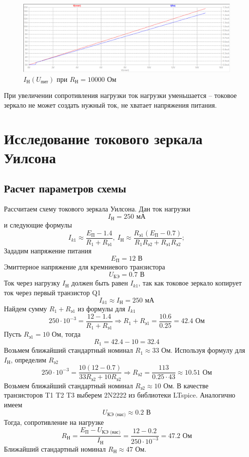 \documentclass[a4paper, 12pt]{article}
\begin{document}
    \begin{figure}[H]
        \centering
        \includegraphics[scale=0.46]{1task_Iн(Vпит)_Rн10000.png}
        \captionsetup{skip=0pt}
        \caption{$I_\text{Н}\left( U_\text{пит} \right)$ при $R_\text{Н}=10000$ Ом}
        \label{fig:1task_InVlR10000}
    \end{figure}
    \noindent При увеличении сопротивления нагрузки ток нагрузки уменьшается -- токовое зеркало не может создать нужный ток,
    не хватает напряжения питания.


    \section{Исследование токового зеркала Уилсона}
    \subsection{Расчет параметров схемы}
    Рассчитаем схему токового зеркала Уилсона. Дан ток нагрузки
    $$
    I_\text{Н}=250\text{ мА}
    $$
    и следующие формулы
    $$
    I_{k1}\approx\dfrac{E_\text{П}-1.4}{R_1+R_\text{э1}},\ I_\text{Н}\approx\dfrac{R_\text{э1}\left( E_\text{П}-0.7 \right)}{R_1R_\text{э2}+R_\text{э1}R_\text{э2}};
    $$
    Зададим напряжение питания $$E_\text{П}=12\text{ В}$$
    Эмиттерное напряжение для кремниевого транзистора
    $$
    U_\text{БЭ}=0.7\text{ В}
    $$
    Ток через нагрузку $I_\text{Н}$ должен быть равен $I_{k1}$, так как токовое зеркало копирует ток через первый транзистор Q1
    $$
    I_{k1}\approx I_\text{Н}=250\text{ мА}
    $$
    Найдем сумму $R_1+R_\text{э1}$ из формулы для $I_{k1}$
    $$
    250\cdot10^{-3}=\dfrac{12-1.4}{R_1+R_\text{э1}}\Rightarrow R_1+R_\text{э1}=\dfrac{10.6}{0.25}=42.4\text{ Ом}
    $$
    Пусть $R_\text{э1}=10$ Ом, тогда
    $$
    R_1=42.4-10=32.4
    $$
    Возьмем ближайший стандартный номинал $R_1\approx33$ Ом. Используя формулу для $I_\text{Н}$,
    определим $R_\text{э2}$
    $$
    250\cdot10^{-3}=\dfrac{10\left( 12-0.7 \right)}{33R_\text{э2}+10R_\text{э2}}\Rightarrow R_\text{э2}=\dfrac{113}{0.25\cdot43}\approx10.51\text{ Ом}
    $$
    Возьмем ближайший стандартный номинал $R_\text{э2}\approx10$ Ом. В качестве транзисторов T1 T2 T3 выберем 2N2222
    из библиотеки LTspice. Аналогично имеем
    $$
    U_\text{КЭ (нас)}\approx0.2\text{ В}
    $$
    Тогда, сопротивление на нагрузке
    $$
    R_\text{Н}=\dfrac{E_\text{П}-U_\text{КЭ (нас)}}{I_\text{Н}}=\dfrac{12-0.2}{250\cdot10^{-3}}=47.2\text{ Ом}
    $$
    Ближайший стандартный номинал $R_\text{Н}\approx47$ Ом.
\end{document}
